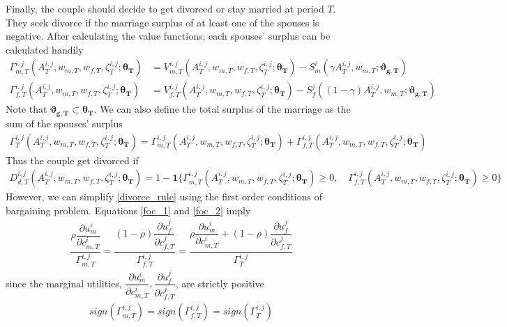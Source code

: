 Finally, the couple should decide to get divorced or stay married at period $T$. They seek divorce if the marriage surplus of at least one of the spouses is negative. After calculating the value functions, each spouses' surplus can be calculated handily  
\begin{align*}
\Gamma_{m,T}^{i,j} (A^{i,j}_T, w_{m,T}, w_{f,T}, \zeta^{i,j}_T; \bm{\theta_T})&= V^{i,j}_{m,T} (A^{i,j}_T, w_{m,T}, w_{f,T}, \zeta^{i,j}_T; \bm{\theta_T}) - S_m^i(\gamma A^{i,j}_T, w_{m,T}; \bm{\vartheta_{g,T}}) \\
\Gamma_{f,T}^{i,j} (A^{i,j}_T, w_{m,T}, w_{f,T}, \zeta^{i,j}_T; \bm{\theta_T})&= V^{i,j}_{f,T} (A^{i,j}_T, w_{m,T}, w_{f,T}, \zeta^{i,j}_T; \bm{\theta_T}) - S_f^j((1-\gamma) A^{i,j}_T, w_{m,T}; \bm{\vartheta_{g,T}})
\end{align*}
Note that $\bm{\vartheta_{g,T}} \subset \bm{\theta_T}$. We can also define the total surplus of the marriage as the sum of the spouses' surplus 
\begin{align*}
\Gamma_T^{i,j} (A^{i,j}_T, w_{m,T}, w_{f,T}, \zeta^{i,j}_T; \bm{\theta_T}) = \Gamma_{m,T}^{i,j} (A^{i,j}_T, w_{m,T}, w_{f,T}, \zeta^{i,j}_T; \bm{\theta_T}) + \Gamma_{f,T}^{i,j} (A^{i,j}_T, w_{m,T}, w_{f,T}, \zeta^{i,j}_T; \bm{\theta_T})
\end{align*}
Thus the couple get divorced if 
\begin{align}
D^{i,j}_{d,T} (A^{i,j}_T, w_{m,T}, w_{f,T}, \zeta^{i,j}_T; \bm{\theta_T}) = 1 - \mathbf 1\{\Gamma_{m,T}^{i,j} (A^{i,j}_T, w_{m,T}, w_{f,T}, \zeta^{i,j}_T; \bm{\theta_T}) \geq 0, \quad \Gamma_{f,T}^{i,j} (A^{i,j}_T, w_{m,T}, w_{f,T}, \zeta^{i,j}_T; \bm{\theta_T}) \geq 0\} \label{divorce_rule}
\end{align}
However, we can simplify \eqref{divorce_rule} using the first order conditions of bargaining problem. Equations \eqref{foc_1} and \eqref{foc_2} imply 
\begin{align}
\dfrac{\rho \dfrac{\partial u_m^i}{\partial c^i_{m,T}}}{\Gamma_{m,T}^{i,j}} =  \dfrac{(1 -\rho) \dfrac{\partial u_f^j}{\partial c^j_{f,T}}}{\Gamma_{f,T}^{i,j}} = 
\dfrac{\rho \dfrac{\partial u_m^i}{\partial c^i_{m,T}} + (1 -\rho) \dfrac{\partial u_f^j}{\partial c^j_{f,T}}}{\Gamma_{T}^{i,j}} \label{equiv}
\end{align}
since the marginal utilities, $\dfrac{\partial u_m^i}{\partial c^i_{m,T}}, \dfrac{\partial u_f^j}{\partial c^j_{f,T}}$, are strictly positive
\begin{align}
sign(\Gamma_{m,T}^{i,j}) = sign(\Gamma_{f,T}^{i,j}) = sign(\Gamma_{T}^{i,j}) \label{equiv_gamma}
\end{align} 
